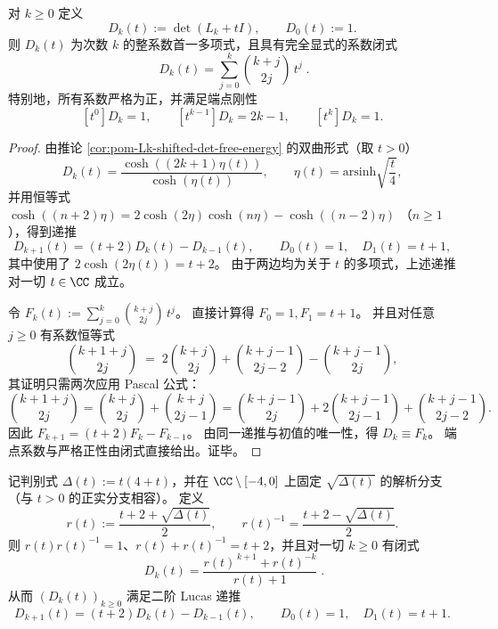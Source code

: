 
\begin{proposition}\label{prop:pom-Lk-det-coeff-binomial}
对 \(k\ge 0\) 定义
\[
D_k(t):=\det(L_k+tI),
\qquad
D_0(t):=1.
\]
则 \(D_k(t)\) 为次数 \(k\) 的整系数首一多项式，且具有完全显式的系数闭式
\[
\boxed{\;
D_k(t)=\sum_{j=0}^{k}\binom{k+j}{2j}\,t^{j}\; }.
\]
特别地，所有系数严格为正，并满足端点刚性
\[
[t^0]D_k=1,\qquad [t^{k-1}]D_k=2k-1,\qquad [t^{k}]D_k=1.
\]
\end{proposition}

\begin{proof}
由推论 \ref{cor:pom-Lk-shifted-det-free-energy} 的双曲形式（取 \(t>0\)）
\[
D_k(t)=\frac{\cosh((2k+1)\eta(t))}{\cosh(\eta(t))},
\qquad
\eta(t)=\mathrm{arsinh}\sqrt{\frac{t}{4}},
\]
并用恒等式
\(
\cosh((n+2)\eta)=2\cosh(2\eta)\cosh(n\eta)-\cosh((n-2)\eta)
\)
（\(n\ge 1\)），得到递推
\[
D_{k+1}(t)=(t+2)D_k(t)-D_{k-1}(t),
\qquad
D_0(t)=1,\quad D_1(t)=t+1,
\]
其中使用了 \(2\cosh(2\eta(t))=t+2\)。
由于两边均为关于 \(t\) 的多项式，上述递推对一切 \(t\in\CC\) 成立。
\par
令
\(
F_k(t):=\sum_{j=0}^{k}\binom{k+j}{2j}\,t^j
\)。
直接计算得 \(F_0=1,F_1=t+1\)。
并且对任意 \(j\ge 0\) 有系数恒等式
\[
\binom{k+1+j}{2j}
\;=\;
2\binom{k+j}{2j}+\binom{k+j-1}{2j-2}-\binom{k+j-1}{2j},
\]
其证明只需两次应用 Pascal 公式：
\[
\binom{k+1+j}{2j}
=\binom{k+j}{2j}+\binom{k+j}{2j-1}
=\binom{k+j-1}{2j}+2\binom{k+j-1}{2j-1}+\binom{k+j-1}{2j-2}.
\]
因此 \(F_{k+1}=(t+2)F_k-F_{k-1}\)。
由同一递推与初值的唯一性，得 \(D_k\equiv F_k\)。
端点系数与严格正性由闭式直接给出。证毕。
\end{proof}

\begin{corollary}\label{cor:pom-Lk-det-lucas-unit}
记判别式 \(\Delta(t):=t(4+t)\)，并在 \(\CC\setminus[-4,0]\) 上固定 \(\sqrt{\Delta(t)}\) 的解析分支（与 \(t>0\) 的正实分支相容）。
定义
\[
r(t):=\frac{t+2+\sqrt{\Delta(t)}}{2},
\qquad
r(t)^{-1}=\frac{t+2-\sqrt{\Delta(t)}}{2}.
\]
则 \(r(t)r(t)^{-1}=1\)、\(r(t)+r(t)^{-1}=t+2\)，并且对一切 \(k\ge 0\) 有闭式
\[
\boxed{\;
D_k(t)=\frac{r(t)^{\,k+1}+r(t)^{-k}}{r(t)+1}\; }.
\]
从而 \((D_k(t))_{k\ge 0}\) 满足二阶 Lucas 递推
\[
D_{k+1}(t)=(t+2)D_k(t)-D_{k-1}(t),
\qquad
D_0(t)=1,\quad D_1(t)=t+1.
\]
\end{corollary}

